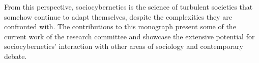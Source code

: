\documentclass[a4page]{article}
\begin{document}
From this perspective, sociocybernetics is the science of turbulent societies that somehow continue to adapt themselves, despite the complexities they are confronted with. The contributions to this monograph present some of the current work of the research committee and showcase the extensive potential for sociocybernetics' interaction with other areas of sociology and contemporary debate.

\newpage
\printbibliography
\end{document}
